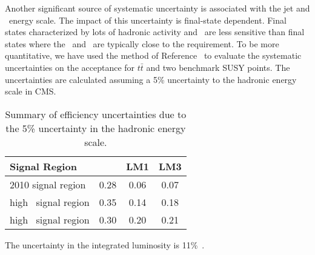 Another significant source of systematic uncertainty is 
associated with the jet and \met\ energy scale.  The impact
of this uncertainty is final-state dependent.  Final
states characterized by lots of hadronic activity and \met\ are 
less sensitive than final states where the \met\ and \Ht\
are typically close to the requirement.  To be more quantitative,
we have used the method of Reference~\cite{ref:top} to evaluate
the systematic uncertainties on the acceptance for $t\bar{t}$ 
and two benchmark SUSY points.  The uncertainties are calculated
assuming a 5\% uncertainty to the hadronic energy scale in CMS.

\begin{table}[hbt]
\begin{center}
\caption{\label{tab:jetmet} 
Summary of efficiency uncertainties due to the 5\% uncertainty in the hadronic energy scale.
}
\begin{tabular}{l|ccc}
\hline
Signal Region             & \ttbar  &   LM1   &   LM3    \\
\hline
2010 signal region        &  0.28   &  0.06   &  0.07    \\
high \met\ signal region  &  0.35   &  0.14   &  0.18    \\ 
high \Ht\ signal region   &  0.30   &  0.20   &  0.21    \\
\hline
\end{tabular}
\end{center}
\end{table}

The uncertainty in the integrated luminosity is 11\%~\cite{ref:lumi}.

